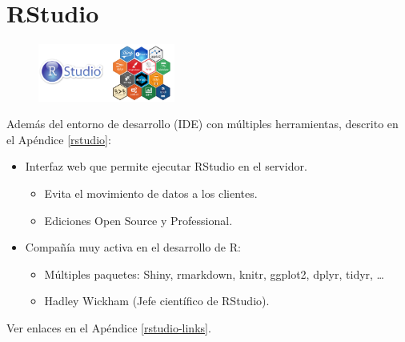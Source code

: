 \documentclass[]{book}
\begin{document}
\section{RStudio}\label{rstudio-com}

\begin{figure}
\centering
\includegraphics[width=0.40000\textwidth]{figuras/rstudio_stickers.png}
\caption{}
\end{figure}

Además del entorno de desarrollo (IDE) con múltiples herramientas,
descrito en el Apéndice \ref{rstudio}:

\begin{itemize}
\item
  Interfaz web que permite ejecutar RStudio en el servidor.

  \begin{itemize}
  \item
    Evita el movimiento de datos a los clientes.
  \item
    Ediciones Open Source y Professional.
  \end{itemize}
\item
  Compañía muy activa en el desarrollo de R:

  \begin{itemize}
  \item
    Múltiples paquetes: Shiny, rmarkdown, knitr, ggplot2, dplyr, tidyr,
    \ldots{}
  \item
    Hadley Wickham (Jefe científico de RStudio).
  \end{itemize}
\end{itemize}

Ver enlaces en el Apéndice \ref{rstudio-links}.


\end{document}
